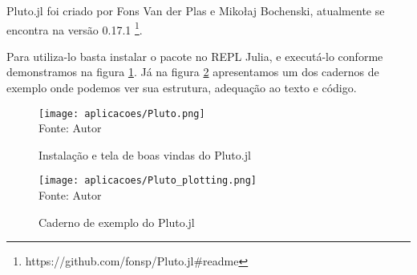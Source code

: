 Pluto.jl foi criado por Fons Van der Plas e Mikołaj Bochenski, atualmente se encontra na versão 0.17.1 \footnote{https://github.com/fonsp/Pluto.jl\#readme}.  

Para utiliza-lo basta instalar o pacote no REPL Julia, e executá-lo conforme demonstramos na figura \ref{Pluto}. Já na figura \ref{Pluto_plot} apresentamos um dos cadernos de exemplo onde podemos ver sua estrutura, adequação ao texto e código. 

\begin{figure}[H]
\begin{center}
    \caption{Instalação e tela de boas vindas do Pluto.jl} \label{Pluto}
    \texttt{[image: aplicacoes/Pluto.png]} \\
    {\tiny \sf Fonte: Autor}
\end{center}
\end{figure} 

\begin{figure}[H]
\begin{center}
    \caption{Caderno de exemplo do Pluto.jl} \label{Pluto_plot}
    \texttt{[image: aplicacoes/Pluto\_plotting.png]} \\
    {\tiny \sf Fonte: Autor}
\end{center}
\end{figure} 